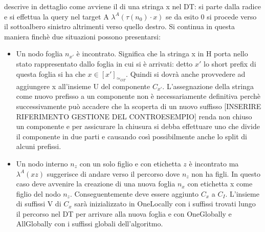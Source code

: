 descrive in dettaglio come avviene il  di una stringa x nel \ac{DT}: si parte dalla radice e si effettua la query nel target A $\lambda^{A}(\tau(n_{0})\cdot{}x)$ se da esito 0 si procede verso il sottoalbero sinistro altrimenti verso quello destro. Si continua in questa maniera finchè due situazioni possono presentarsi:
\begin{itemize}
\item Un nodo foglia $n_{x'}$ è incontrato. Significa che la stringa x in \ac{H} porta nello stato rappresentato dallo foglia in cui si è arrivati: detto $x'$ lo short prefix di questa foglia si ha che $x \in [x']_{\simeq_{OT}}$. Quindi si dovrà anche provvedere ad aggiungere x all'insieme U del componente $C_{x'}$. L'assegnazione della stringa come nuovo prefisso a un componente non è necessariamente definitiva perchè successivamente può accadere che la scoperta di un nuovo suffisso [INSERIRE RIFERIMENTO GESTIONE DEL CONTROESEMPIO] renda non chiuso un componente e per assicurare la chiusura si debba effettuare uno  che divide il componente in due parti e causando così possibilmente anche lo split di alcuni prefissi.
\item
Un nodo interno $n_{z}$ con un solo figlio e con etichetta $z$ è incontrato ma  $\lambda^{A}(xz)$ suggerisce di andare verso il percorso dove $n_{z}$ non ha figli. In questo caso deve avvenire la creazione di una nuova foglia $n_{x}$ con etichetta x come figlio del nodo $n_{z}$. Conseguentemente deve essere aggiunto $C_x$ a $C_I$. L'insieme di suffissi V di $C_x$ sarà inizializzato in OneLocally con i suffissi trovati lungo il percorso nel \ac{DT} per arrivare alla nuova foglia e con OneGlobally e AllGlobally  con i suffissi globali dell'algoritmo.\end{itemize}
